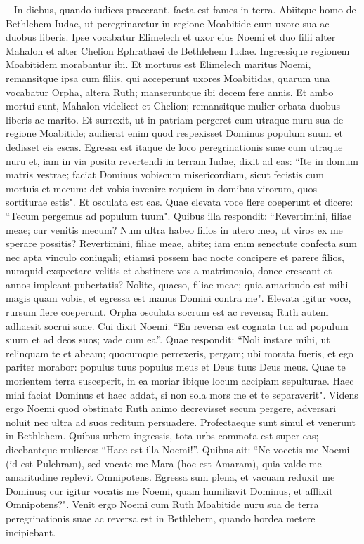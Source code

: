 
\begin{biblechapter}   
\verse In diebus, quando iudices praeerant, facta est fames in terra. Abiitque homo de Bethlehem Iudae, ut peregrinaretur in regione Moabitide cum uxore sua ac duobus liberis. 
\verse Ipse vocabatur Elimelech et uxor eius Noemi et duo filii alter Mahalon et alter Chelion Ephrathaei de Bethlehem Iudae. Ingressique regionem Moabitidem morabantur ibi.  
\verse Et mortuus est Elimelech maritus Noemi, remansitque ipsa cum filiis, 
\verse qui acceperunt uxores Moabitidas, quarum una vocabatur Orpha, altera Ruth; manseruntque ibi decem fere annis. 
\verse Et ambo mortui sunt, Mahalon videlicet et Chelion; remansitque mulier orbata duobus liberis ac marito. 
\verse Et surrexit, ut in patriam pergeret cum utraque nuru sua de regione Moabitide; audierat enim quod respexisset Dominus populum suum et dedisset eis escas. 
\verse Egressa est itaque de loco peregrinationis suae cum utraque nuru et, iam in via posita revertendi in terram Iudae, 
\verse dixit ad eas: “Ite in domum matris vestrae; faciat Dominus vobiscum misericordiam, sicut fecistis cum mortuis et mecum: 
\verse det vobis invenire requiem in domibus virorum, quos sortiturae estis". Et osculata est eas. Quae elevata voce flere coeperunt 
\verse et dicere: “Tecum pergemus ad populum tuum". 
\verse Quibus illa respondit: “Revertimini, filiae meae; cur venitis mecum? Num ultra habeo filios in utero meo, ut viros ex me sperare possitis? 
\verse Revertimini, filiae meae, abite; iam enim senectute confecta sum nec apta vinculo coniugali; etiamsi possem hac nocte concipere et parere filios, 
\verse numquid exspectare velitis et abstinere vos a matrimonio, donec crescant et annos impleant pubertatis? Nolite, quaeso, filiae meae; quia amaritudo est mihi magis quam vobis, et egressa est manus Domini contra me". 
\verse Elevata igitur voce, rursum flere coeperunt. Orpha osculata socrum est ac reversa; Ruth autem adhaesit socrui suae. 
\verse Cui dixit Noemi: “En reversa est cognata tua ad populum suum et ad deos suos; vade cum ea”. 
\verse Quae respondit: “Noli instare mihi, ut relinquam te et abeam; quocumque perrexeris, pergam; ubi morata fueris, et ego pariter morabor: populus tuus populus meus et Deus tuus Deus meus. 
\verse Quae te morientem terra susceperit, in ea moriar ibique locum accipiam sepulturae. Haec mihi faciat Dominus et haec addat, si non sola mors me et te separaverit".  
\verse Videns ergo Noemi quod obstinato Ruth animo decrevisset secum pergere, adversari noluit nec ultra ad suos reditum persuadere. 
\verse Profectaeque sunt simul et venerunt in Bethlehem. Quibus urbem ingressis, tota urbs commota est super eas; dicebantque mulieres: “Haec est illa Noemi!”. 
\verse Quibus ait: “Ne vocetis me Noemi (id est Pulchram), sed vocate me Mara (hoc est Amaram), quia valde me amaritudine replevit Omnipotens. 
\verse Egressa sum plena, et vacuam reduxit me Dominus; cur igitur vocatis me Noemi, quam humiliavit Dominus, et afflixit Omnipotens?". 
\verse Venit ergo Noemi cum Ruth Moabitide nuru sua de terra peregrinationis suae ac reversa est in Bethlehem, quando hordea metere incipiebant. 
\end{biblechapter}

